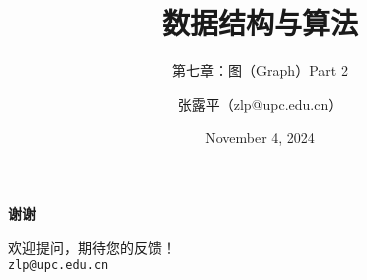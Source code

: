 \documentclass[
    10pt,
    aspectratio=169
    ]{beamer}
\title{数据结构与算法}
\subtitle{第七章：图（Graph）Part 2}
\date{November 4, 2024}
\author{张露平（zlp@upc.edu.cn）}
\institute{经济管理学院-中国石油大学（华东）}
\begin{document}
\maketitle

\begin{spacing}{1.5}
    


    \appendix
    \begin{frame}[plain] %
        \centering
        \vspace{2cm} %
        \textbf{\LARGE{谢谢}}
        \vspace{1cm}

        \small
        欢迎提问，期待您的反馈！ \\
        \vspace{1cm}
        \texttt{zlp@upc.edu.cn}
    \end{frame}
\end{spacing}
\end{document}
